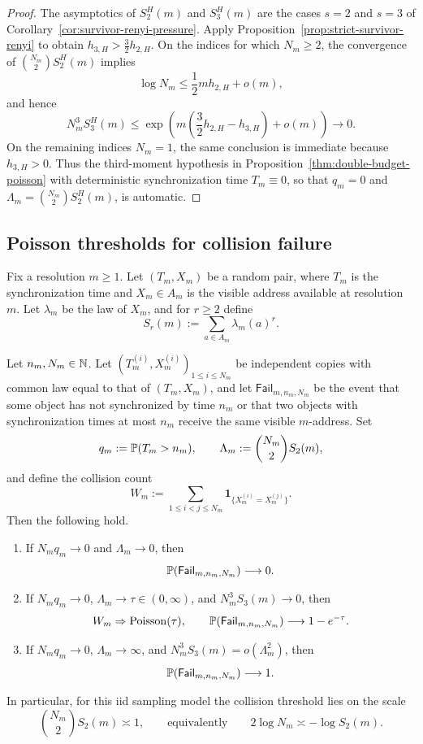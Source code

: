 \begin{proof}
The asymptotics of \(S_2^H(m)\) and \(S_3^H(m)\) are the cases \(s=2\)
and \(s=3\) of Corollary~\ref{cor:survivor-renyi-pressure}.  Apply
Proposition~\ref{prop:strict-survivor-renyi} to obtain
\(h_{3,H}>\frac32h_{2,H}\).  On the indices for which \(N_m\geq2\),
the convergence of \(\binom{N_m}{2}S_2^H(m)\) implies
\[
  \log N_m\leq \frac12mh_{2,H}+o(m),
\]
and hence
\[
  N_m^3S_3^H(m)
  \leq
  \exp\left(
    m\left(\frac32h_{2,H}-h_{3,H}\right)+o(m)
  \right)
  \longrightarrow0.
\]
On the remaining indices \(N_m=1\), the same conclusion is immediate
because \(h_{3,H}>0\).  Thus the third-moment hypothesis in
Proposition~\ref{thm:double-budget-poisson} with deterministic synchronization
time \(T_m\equiv 0\), so that \(q_m=0\) and
\(\Lambda_m=\binom{N_m}{2}S_2^H(m)\), is automatic.
\end{proof}

\subsection{Poisson thresholds for collision failure}

Fix a resolution \(m\geq 1\).  Let \((T_m,X_m)\) be a random pair,
where \(T_m\) is the synchronization time and \(X_m\in A_m\) is the
visible address available at resolution \(m\).  Let \(\lambda_m\) be the
law of \(X_m\), and for \(r\geq 2\) define
\[
  S_r(m):=\sum_{a\in A_m}\lambda_m(a)^r.
\]

\begin{proposition}
\label{thm:double-budget-poisson}
Let \(n_m,N_m\in\mathbb{N}\).  Let
\((T_m^{(i)},X_m^{(i)})_{1\leq i\leq N_m}\) be independent copies with
common law equal to that of \((T_m,X_m)\), and let
\(\mathsf{Fail}_{m,n_m,N_m}\) be the event that
some object has not synchronized by time \(n_m\) or that two objects
with synchronization times at most \(n_m\) receive the same visible
\(m\)-address.  Set
\[
  q_m:=\mathbb{P}(T_m>n_m),
  \qquad
  \Lambda_m:=\binom{N_m}{2}S_2(m),
\]
and define the collision count
\[
  W_m:=\sum_{1\leq i<j\leq N_m}
       \mathbf{1}_{\{X_m^{(i)}=X_m^{(j)}\}}.
\]
Then the following hold.
\begin{enumerate}[label=(\roman*)]
  \item If \(N_m q_m\to 0\) and \(\Lambda_m\to 0\), then
    \[
      \mathbb{P}(\mathsf{Fail}_{m,n_m,N_m})\longrightarrow 0.
    \]
  \item If \(N_m q_m\to 0\), \(\Lambda_m\to\tau\in(0,\infty)\), and
    \(N_m^3S_3(m)\to 0\), then
    \[
      W_m \Rightarrow \mathrm{Poisson}(\tau),
      \qquad
      \mathbb{P}(\mathsf{Fail}_{m,n_m,N_m})\longrightarrow 1-e^{-\tau}.
    \]
  \item If \(N_m q_m\to 0\), \(\Lambda_m\to\infty\), and
    \(N_m^3S_3(m)=o(\Lambda_m^2)\), then
    \[
      \mathbb{P}(\mathsf{Fail}_{m,n_m,N_m})\longrightarrow 1.
    \]
\end{enumerate}
In particular, for this iid sampling model the collision threshold lies
on the scale
\[
  \binom{N_m}{2}S_2(m)\asymp 1,
  \qquad\text{equivalently}\qquad
  2\log N_m \asymp -\log S_2(m).
\]
\end{proposition}

